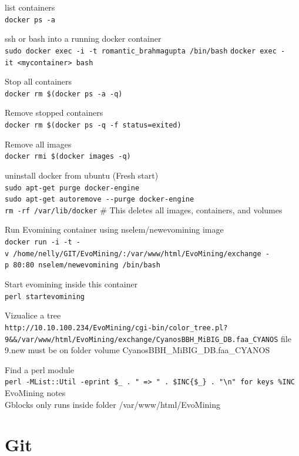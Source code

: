 \documentclass[12pt,twoside]{reedthesis}
\begin{document}
  list containers\\
  \texttt{docker\ ps\ -a}
  
  ssh or bash into a running docker container\\
  \texttt{sudo\ docker\ exec\ -i\ -t\ romantic\_brahmagupta\ /bin/bash}
  \texttt{docker\ exec\ -it\ \textless{}mycontainer\textgreater{}\ bash}
  
  Stop all containers\\
  \texttt{docker\ rm\ \$(docker\ ps\ -a\ -q)}
  
  Remove stopped containers\\
  \texttt{docker\ rm\ \$(docker\ ps\ -q\ -f\ status=exited)}
  
  Remove all images\\
  \texttt{docker\ rmi\ \$(docker\ images\ -q)}
  
  uninstall docker from ubuntu (Fresh start)\\
  \texttt{sudo\ apt-get\ purge\ docker-engine}\\
  \texttt{sudo\ apt-get\ autoremove\ -\/-purge\ docker-engine}\\
  \texttt{rm\ -rf\ /var/lib/docker} \# This deletes all images,
  containers, and volumes
  
  Run Evomining container using nselem/newevomining image\\
  \texttt{docker\ run\ -i\ -t\ -v\ /home/nelly/GIT/EvoMining/:/var/www/html/EvoMining/exchange\ -p\ 80:80\ nselem/newevomining\ /bin/bash}
  
  Start evomining inside this container\\
  \texttt{perl\ startevomining}
  
  Vizualice a tree\\
  \texttt{http://10.10.100.234/EvoMining/cgi-bin/color\_tree.pl?9\&\&/var/www/html/EvoMining/exchange/CyanosBBH\_MiBIG\_DB.faa\_CYANOS}
  file 9.new must be on folder volume CyanosBBH\_MiBIG\_DB.faa\_CYANOS
  
  Find a perl module\\
  \texttt{perl\ -MList::Util\ -e\textquotesingle{}print\ \$\_\ .\ "\ =\textgreater{}\ "\ .\ \$INC\{\$\_\}\ .\ "\textbackslash{}n"\ for\ keys\ \%INC\textquotesingle{}}
  EvoMining notes\\
  Gblocks only runs inside folder /var/www/html/EvoMining
  
  \section{Git}\label{git}
  
\end{document}
